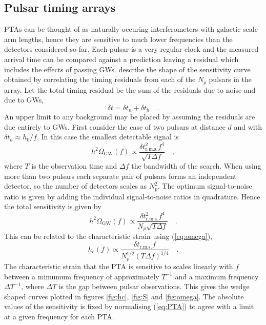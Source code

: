 \subsection{Pulsar timing arrays}
PTAs can be thought of as naturally occuring interferometers with galactic scale arm lengths, hence they are sensitive to much lower frequencies than the detectors considered so far.
Each pulsar is a very regular clock and the measured arrival time can be compared against a prediction leaving a residual which includes the effects of passing GWs. \cite{SesanaVecchioColancino} describe the shape of the sensitivity curve obtained by correlating the timing residuals from each of the $N_{p}$ pulsars in the array. Let the total timing residual be the sum of the residuals due to noise and due to GWs,
\begin{equation} \delta t= \delta t_{n} + \delta t _{h} \quad .\end{equation}
An upper limit to any background may be placed by assuming the residuals are due entirely to GWs. First consider the case of two pulsars at distance $d$ and with $\delta t_{h}\approx h_{0}/f$. In this case the smallest detectable signal is
\begin{equation} h^{2}\Omega_{\textrm{GW}}(f) \propto \frac{\delta t^{2}_{\textrm{r.m.s.}}f^{4}}{\sqrt{T\Delta f}} \quad , \end{equation}
where $T$ is the observation time and $\Delta f$ the bandwidth of the search. When using more than two pulsars each separate pair of pulsars forms an independent detector, so the number of detectors scales as $N_{p}^{2}$. The optimum signal-to-noise ratio is given by adding the individual signal-to-noise ratios in quadrature. Hence the total sensitivity is given by
\begin{equation} h^{2}\Omega_{\textrm{GW}}(f) \propto \frac{\delta t^{2}_{\textrm{r.m.s.}}f^{4}}{N_{p}\sqrt{T\Delta f}} \quad . \end{equation}
This can be related to the characteristic strain using (\ref{eq:omega}),
\begin{equation}\label{eq:PTA} h_{c}(f) \propto \frac{\delta t_{\textrm{r.m.s.}}f}{N_{p}^{1/2}\left( T\Delta f \right)^{1/4}} \quad . \end{equation}
The characteristic strain that the PTA is sensitive to scales linearly with $f$ between a mimumum frequency of approximately $T^{-1}$ and a maximum frequency $\Delta T ^{-1}$, where $\Delta T$ is the gap between pulsar observations. This gives the wedge shaped curves plotted in figures \ref{fig:hc}, \ref{fig:S} and \ref{fig:omega}. The absolute values of the sensitivity is fixed by normalising (\ref{eq:PTA}) to agree with a limit at a given frequency for each PTA.

